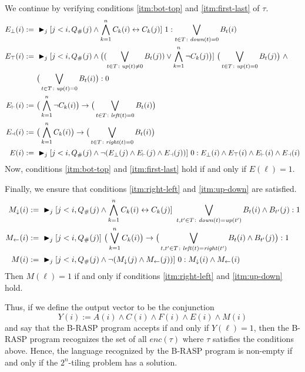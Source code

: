 We continue by verifying conditions \ref{itm:bot-top} and \ref{itm:first-last} of $\tau$. 
\begin{align*}
E_\bot(i) :=&\ \maxatt_j[j<i,Q_\#(j) \wedge \bigwedge_{k=1}^n C_k(i) \leftrightarrow C_k(j)]\ 1 : 
\bigvee_{t \in T \colon \tdown(t) = 0} B_t(i)\\
E_\top(i) :=&\ \maxatt_j[j<i,Q_\#(j) \wedge 
\big((\bigvee_{t \in T \colon \tup(t) \ne 0} B_t(j)) \vee \bigwedge_{k=1}^n \neg C_k(j)\big)]\ 
\big(\bigvee_{t \in T \colon \tup(t) = 0} B_t(j)\big)\ \wedge\\&\ \big(\bigvee_{t \in T \colon \tup(t) = 0} B_t(i)\big) : 0\\
E_\vdash(i) :=&\ \big(\bigwedge_{k=1}^n \neg C_k(i)\big) \to \big(\bigvee_{t \in T \colon \tleft(t) = 0} B_t(i)\big)\\
E_\dashv(i) :=&\ \big(\bigwedge_{k=1}^n C_k(i)\big) \to \big(\bigvee_{t \in T \colon \tright(t) = 0} B_t(i)\big)\\
E(i) :=&\ \maxatt_j[j<i, Q_\#(j) \wedge \neg(E_\bot(j) \wedge E_\vdash(j) \wedge E_\dashv(j))]\ 0 :
E_\bot(i) \wedge E_\top(i) \wedge E_\vdash(i) \wedge E_\dashv(i)
\end{align*}
Now, conditions \ref{itm:bot-top} and \ref{itm:first-last} hold if and only if $E(\ell) = 1$.

Finally, we ensure that conditions \ref{itm:right-left} and \ref{itm:up-down} are satisfied.
\begin{align*}
M_\downarrow(i) :=&\ \maxatt_j[j<i,Q_\#(j) \wedge \bigwedge_{k=1}^n C_k(i) \leftrightarrow C_k(j)]\ 
\bigvee_{t,t' \in T \colon \tdown(t) = \tup(t')} B_t(i) \wedge B_{t'}(j) : 1\\
M_\leftarrow(i) :=&\ \maxatt_j[j<i,Q_\#(j)]\ \big(\bigvee_{k=1}^n C_k(i)\big) \to 
\big(\bigvee_{t,t' \in T \colon \tleft(t) = \tright(t')} B_t(i) \wedge B_{t'}(j)\big) : 1\\
M(i) :=&\ \maxatt_j[j<i, Q_\#(j) \wedge \neg(M_\downarrow(j) \wedge M_\leftarrow(j))]\ 0 : M_\downarrow(i) \wedge M_\leftarrow(i)
\end{align*}
Then $M(\ell) = 1$ if and only if conditions \ref{itm:right-left} and \ref{itm:up-down} hold.

Thus, if we define the output vector to be the conjunction
\[Y(i) := A(i) \wedge C(i) \wedge F(i) \wedge E(i) \wedge M(i)\]
and say that the B-RASP program accepts if and only if $Y(\ell) = 1$,
then the B-RASP program recognizes the set of all $\mathit{enc}(\tau)$ where $\tau$ satisfies the conditions above.
Hence, the language recognized by the B-RASP program is non-empty if and only if the $2^n$-tiling problem has a solution.


